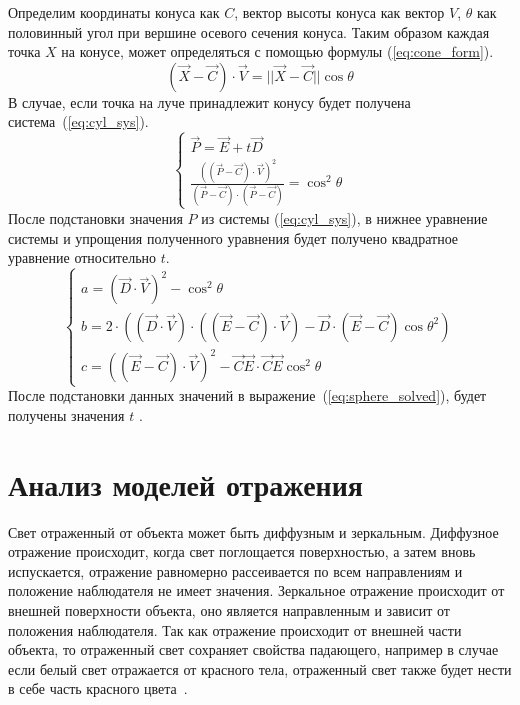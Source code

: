 Определим координаты конуса как $C$, вектор высоты конуса как вектор $V$, 
$\theta$ как половинный угол при вершине осевого сечения конуса. Таким образом
каждая точка $X$ на конусе, может определяться с помощью формулы (\ref{eq:cone_form}).
\begin{equation}
	(\vec{X} - \vec{C}) \cdot \vec{V} = ||\vec{X} - \vec{C}||\cos{\theta}
	\label{eq:cone_form}
\end{equation}
В случае, если точка на луче принадлежит конусу будет получена система~(\ref{eq:cyl_sys}).
\begin{equation}
	\begin{cases}
		\vec{P} = \vec{E} + t\vec{D} \\
		\frac{((\vec{P} - \vec{C}) \cdot \vec{V})^{2}}{(\vec{P} - \vec{C}) \cdot (\vec{P} - \vec{C})} = {\cos^{2}{\theta}}
	\end{cases}
	\label{eq:cyl_sys}
\end{equation}
После подстановки значения $P$ из системы (\ref{eq:cyl_sys}), в нижнее уравнение системы и упрощения полученного уравнения будет получено квадратное уравнение относительно $t$.
\begin{equation}
	\begin{cases}
	a = (\vec{D} \cdot \vec{V})^{2} - \cos^{2}{\theta} \\
	b = 2 \cdot ((\vec{D} \cdot \vec{V}) \cdot ((\vec{E} - \vec{C}) \cdot \vec{V}) - \vec{D} \cdot (\vec{E} - \vec{C}){\cos{\theta}}^{2}) \\
	
	c = ((\vec{E} - \vec{C}) \cdot \vec{V})^{2} - \vec{C}\vec{E} \cdot \vec{C}\vec{E}\cos^{2}{\theta}
	\end{cases}
\end{equation}
После подстановки данных значений в выражение~(\ref{eq:sphere_solved}), будет получены значения $t$ \cite{cone_inter}.



\section{Анализ моделей отражения}
\label{sec:reflection_models}
Свет отраженный от объекта может быть диффузным и зеркальным.
Диффузное отражение происходит, когда свет поглощается поверхностью, а затем вновь испускается, 
отражение равномерно рассеивается по всем направлениям и положение наблюдателя не имеет значения. Зеркальное отражение
происходит от внешней поверхности объекта, оно является направленным и зависит от положения наблюдателя.
Так как отражение происходит от внешней части объекта, то отраженный свет сохраняет свойства падающего, например в случае если белый свет отражается
от красного тела, отраженный свет также будет нести в себе часть красного цвета~\cite{Rodgers}.

